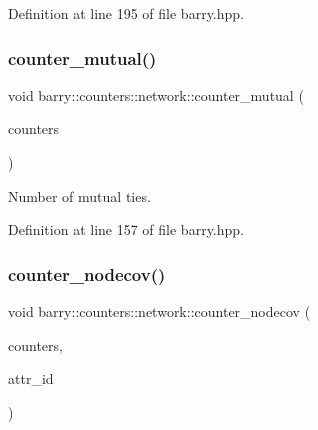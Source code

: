 Definition at line 195 of file barry.\+hpp.

\mbox{\label{namespacebarry_1_1counters_1_1network_afc4086d5788c8d5fa60ec529d9fa15dd}} 
\subsubsection{\texorpdfstring{counter\+\_\+mutual()}{counter\_mutual()}}
{\footnotesize\ttfamily void barry\+::counters\+::network\+::counter\+\_\+mutual (\begin{DoxyParamCaption}\item[{\hyperlink{namespacebarry_1_1counters_1_1network_a3b3c590303d47840d1967372ae495d95}{Net\+Counter\+Vector} $\ast$}]{counters }\end{DoxyParamCaption})\hspace{0.3cm}{\ttfamily [inline]}}



Number of mutual ties. 



Definition at line 157 of file barry.\+hpp.

\mbox{\label{namespacebarry_1_1counters_1_1network_a7087c6419195bc768c1e8c7730757d2e}} 
\subsubsection{\texorpdfstring{counter\+\_\+nodecov()}{counter\_nodecov()}}
{\footnotesize\ttfamily void barry\+::counters\+::network\+::counter\+\_\+nodecov (\begin{DoxyParamCaption}\item[{\hyperlink{namespacebarry_1_1counters_1_1network_a3b3c590303d47840d1967372ae495d95}{Net\+Counter\+Vector} $\ast$}]{counters,  }\item[{\hyperlink{namespacebarry_a11dfc53ddb4672278319aa04f1e09a6c}{uint}}]{attr\+\_\+id }\end{DoxyParamCaption})\hspace{0.3cm}{\ttfamily [inline]}}



